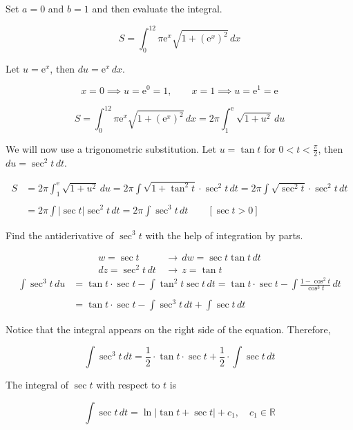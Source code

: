 \documentclass{article}
\begin{document}
\noindent Set $a=0$ and $b=1$ and then evaluate the integral.

\[S=\int_0^12\pi\mathrm{e}^x\sqrt{1+\left(\mathrm{e}^x\right)^2}\,dx\]

\hfill

\noindent Let $u=\mathrm{e}^x$, then $du=\mathrm{e}^x\,dx$.

\[x=0\implies u=\mathrm{e}^0=1,\qquad x=1\implies u=\mathrm{e}^1=\mathrm{e}\]

\[S=\int_0^12\pi\mathrm{e}^x\sqrt{1+\left(\mathrm{e}^x\right)^2}\,dx=2\pi\int_1^{\mathrm{e}}\sqrt{1+u^2}\,du\]

\hfill

\noindent We will now use a trigonometric substitution. Let $u=\tan t$ for $\displaystyle0<t<\frac\pi2$, then $du=\sec^2 t\,dt$.

\begin{align*}S&=2\pi\int_1^{\mathrm{e}}\sqrt{1+u^2}\,du=2\pi\int\sqrt{1+\tan^2t}\cdot\sec^2t\,dt=2\pi\int\sqrt{\sec^2t}\cdot\sec^2t\,dt\\\\&=2\pi\int\left|\sec t\right|\sec^2t\,dt=2\pi\int\sec^3t\,dt\qquad\left[\sec t>0\right]\end{align*}

\hfill

\noindent Find the antiderivative of $\sec^3t$ with the help of integration by parts.

\begin{align*}
    w=\sec t\,&\rightarrow\, dw = \sec t\tan t \,dt\\
    dz=\sec^2t\,dt\,&\rightarrow\, z = \tan t
\end{align*}
\begin{align*}
\int\sec^3t\,du&=\tan t\cdot\sec t-\int\tan^2 t\sec t\,dt=\tan t\cdot\sec t-\int\frac{1-\cos^2t}{\cos^3 t}\,dt\\\\&=\tan t\cdot\sec t-\int\sec^3t\,dt+\int\sec t\,dt 
\end{align*}

\hfill

\noindent Notice that the integral appears on the right side of the equation. Therefore,

\[\int\sec^3t\,dt=\frac12\cdot\tan t\cdot\sec t+\frac12\cdot\int\sec t\,dt\]

\hfill

\noindent The integral of $\sec t$ with respect to $t$ is

\[\int\sec t\,dt=\ln\left|\tan t+\sec t\right|+c_1,\quad c_1\in\mathbb{R}\]
\end{document}
